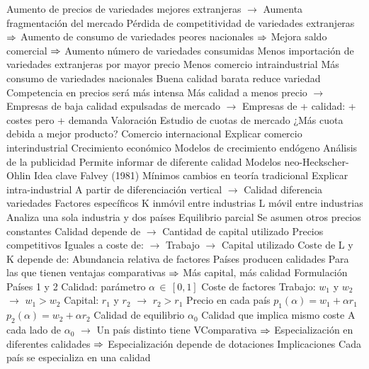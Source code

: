 \documentclass{nuevotema}
\begin{document}
\begin{esquemal}
				\4[] Aumento de precios de variedades mejores extranjeras
				\4[] $\to$ Aumenta fragmentación del mercado
				\4[] Pérdida de competitividad de variedades extranjeras
				\4[] $\then$ Aumento de consumo de variedades peores nacionales
				\4[] $\then$ Mejora saldo comercial
				\4[] $\then$ Aumento número de variedades consumidas
				\4[] Menos importación de variedades extranjeras por mayor precio
				\4[$\then$] Menos comercio intraindustrial
				\4[$\then$] Más consumo de variedades nacionales
				\4 Buena calidad barata reduce variedad
				\4[] Competencia en precios será más intensa
				\4[] Más calidad a menos precio
				\4[] $\to$ Empresas de baja calidad expulsadas de mercado
				\4[] $\to$ Empresas de + calidad: + costes pero + demanda
			\3 Valoración
				\4 Estudio de cuotas de mercado
				\4[] ¿Más cuota debida a mejor producto?
				\4 Comercio internacional
				\4[] Explicar comercio interindustrial
				\4 Crecimiento económico
				\4[] Modelos de crecimiento endógeno
				\4 Análisis de la publicidad
				\4[] Permite informar de diferente calidad
		\2 Modelos neo-Heckscher-Ohlin
			\3 Idea clave
				\4 Falvey (1981)
				\4 Mínimos cambios en teoría tradicional
				\4 Explicar intra-industrial
				\4[] A partir de diferenciación vertical
				\4[] $\to$ Calidad diferencia variedades
				\4 Factores específicos
				\4[] K inmóvil entre industrias
				\4[] L móvil entre industrias
				\4 Analiza una sola industria y dos países
				\4[] Equilibrio parcial
				\4[] Se asumen otros precios constantes
				\4 Calidad depende de
				\4[] $\to$ Cantidad de capital utilizado
				\4 Precios competitivos
				\4[] Iguales a coste de:
				\4[] $\to$ Trabajo
				\4[] $\to$ Capital utilizado
				\4 Coste de L y K depende de:
				\4[] Abundancia relativa de factores
				\4 Países producen calidades
				\4[] Para las que tienen ventajas comparativas
				\4[] $\then$ Más capital, más calidad
			\3 Formulación
				\4 Países 1 y 2
				\4 Calidad: parámetro $\alpha \, \in \, [0,1]$
				\4 Coste de factores
				\4[] Trabajo: $w_1$ y $w_2$
				\4[] $\to$ $w_1 > w_2$
				\4[] Capital: $r_1$ y $r_2$
				\4[] $\to$ $r_2 > r_1$
				\4 Precio en cada país
				\4[] $p_1(\alpha) = w_1 + \alpha r_1$
				\4[] $p_2(\alpha) = w_2 + \alpha r_2$
				\4 Calidad de equilibrio $\alpha_0$
				\4[] Calidad que implica mismo coste
				\4[] A cada lado de $\alpha_0$
				\4[] $\to$ Un país distinto tiene VComparativa
				\4[] $\then$ Especialización en diferentes calidades
				\4[] $\then$ Especialización depende de dotaciones
				\4[] 
			\3 Implicaciones
				\4 Cada país se especializa en una calidad

\end{esquemal}
\end{document}
